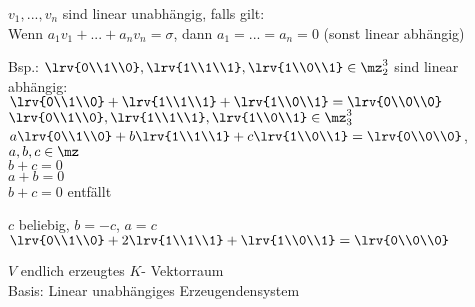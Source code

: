 		\item $v_1,...,v_n$ sind linear unabhängig, falls gilt:\\
		Wenn $a_1v_1+...+a_nv_n=\sigma$, dann $a_1=...=a_n=0$ (sonst linear abhängig)
		
		Bsp.: $\lrv{0\\1\\0},\lrv{1\\1\\1},\lrv{1\\0\\1}\in\mz_2^3$ sind linear abhängig:\\
		$\lrv{0\\1\\0}+\lrv{1\\1\\1}+\lrv{1\\0\\1}=\lrv{0\\0\\0}$\\
		$\lrv{0\\1\\0},\lrv{1\\1\\1},\lrv{1\\0\\1}\in\mz_3^3$\\
		$a\lrv{0\\1\\0}+b\lrv{1\\1\\1}+c\lrv{1\\0\\1}=\lrv{0\\0\\0}$, $a,b,c\in\mz$\\
		$b+c=0$\\
		$a+b=0$\\
		$b+c=0$ entfällt
		
		$c$ beliebig, $b=-c$, $a=c$\\
		$\lrv{0\\1\\0}+2\lrv{1\\1\\1}+\lrv{1\\0\\1}=\lrv{0\\0\\0}$
		
		\item $V$ endlich erzeugtes $K$- Vektorraum\\
		Basis: Linear unabhängiges Erzeugendensystem
	\subExEnd

